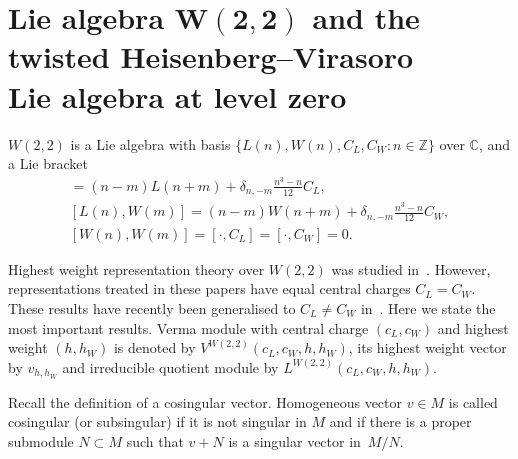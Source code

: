 \documentclass[11pt]{article}
\numberwithin{equation}{section}
\newcommand{\C}{\mathbb C}
\begin{document}
\setcounter{section}{1}
\setcounter{subsection}{0}
\setcounter{subsubsection}{0}
\setcounter{Theorem}{1}
\setcounter{equation}{0}
\section[Lie algebra $W(2,2)$ and the twisted Heisenberg--Virasoro Lie algebra at level zero]{Lie algebra $\boldsymbol{W(2,2)}$ and the twisted Heisenberg--Virasoro\\ Lie algebra at level zero}\label{rep-th-review}
$W(2,2)$ is a Lie algebra with basis $\{L(n), W(n),C_{L},C_{W}\colon n\in\mathbb{Z\}}$ over $\C$, and a Lie bracket
\begin{gather*}
[ L(n) ,L(m) ] =(n-m) L(n+m) +\delta_{n,-m}\frac{n^{3}-n}{12}C_{L}, \\ %
[ L(n) ,W(m) ] =(n-m)W(n+m) +\delta_{n,-m}\frac{n^{3}-n}{12}C_{W}, \\
[ W(n) ,W(m) ] =[ \cdot,C_{L}] =[ \cdot,C_{W}] =0.
\end{gather*}

Highest weight representation theory over $W(2,2)$ was studied in~\cite{JP,R-JMP}. However, representations treated in these papers have
equal central charges $C_{L}=C_{W}$. These results have recently been generalised to $C_{L}\neq C_{W}$ in~\cite{JZ}. Here we state the most important results. Verma module with central charge $(c_{L},c_{W}) $ and highest weight $(h,h_{W}) $ is denoted by $V^{W(2,2)}( c_{L},c_{W},h,h_{W})$, its highest weight vector
by $v_{h,h_W}$ and irreducible quotient module by $L^{W(2,2)} (c_{L},c_{W},h,h_{W})$.

Recall the def\/inition of a cosingular vector. Homogeneous vector $v\in M$ is called cosingular (or subsingular) if it is not singular in $M$ and if there
is a proper submodule $N \subset M$ such that $v+N$ is a singular vector in~$M/N$.
\end{document}
